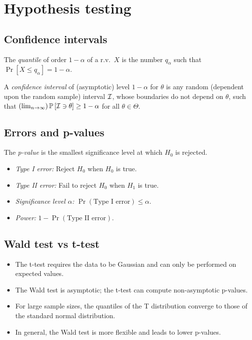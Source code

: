 \documentclass[a4paper]{article}
\begin{document}
\section{Hypothesis testing}
    \subsection{Confidence intervals}
        The \emph{quantile} of order $1 - \alpha$ of a r.v.\ $X$ is the number $q_\alpha$ such that $\Pr{[X \leq q_\alpha]} = 1 - \alpha$.

        A \emph{confidence interval} of (asymptotic) level $1 - \alpha$ for $\theta$ is any random (dependent upon the random sample) interval $\mathcal{I}$, whose boundaries do not depend on $\theta$, such that $\left(\lim_{n \rightarrow \infty}\right) \operatorname{\mathbb{P}}{[\mathcal{I} \ni \theta]} \geq 1 - \alpha$ for all $\theta \in \Theta$.
    
    \subsection{Errors and p-values}
        The \emph{p-value} is the smallest significance level at which $H_0$ is rejected.
        \begin{itemize}
            \item \emph{Type I error:} Reject $H_0$ when $H_0$ is true.
            \item \emph{Type II error:} Fail to reject $H_0$ when $H_1$ is true.
            \item \emph{Significance level $\alpha$:} $\Pr{(\text{Type I error})} \leq \alpha$.
            \item \emph{Power:} $1 - \Pr{(\text{Type II error})}$.
        \end{itemize}

    \subsection{Wald test vs t-test}
        \begin{itemize}
            \item The t-test requires the data to be Gaussian and can only be performed on expected values.
            \item The Wald test is asymptotic; the t-test can compute non-asymptotic p-values.
            \item For large sample sizes, the quantiles of the T distribution converge to those of the standard normal distribution.
            \item In general, the Wald test is more flexible and leads to lower p-values.
        \end{itemize}
\end{document}

